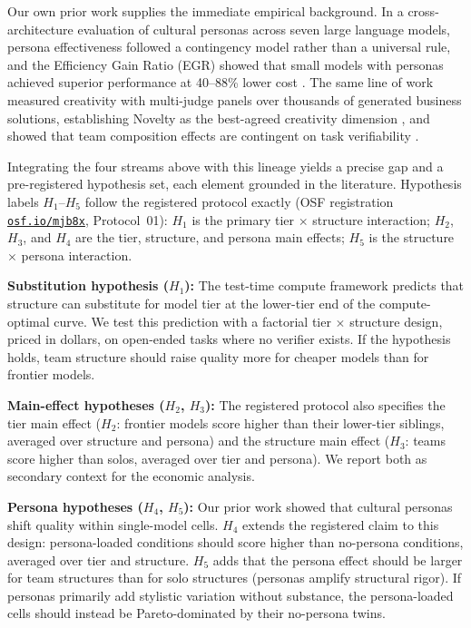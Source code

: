 \documentclass[12pt,a4paper]{article}
\begin{document}
Our own prior work supplies the immediate empirical background. In a
cross-architecture evaluation of cultural personas across seven large language
models, persona effectiveness followed a contingency model rather than a
universal rule, and the Efficiency Gain Ratio (EGR) showed that small models
with personas achieved superior performance at 40--88\% lower cost
\citep{Hariri2026b}. The same line of work measured creativity with multi-judge
panels over thousands of generated business solutions, establishing Novelty as
the best-agreed creativity dimension \citep{Hariri2025a}, and showed that team
composition effects are contingent on task verifiability \citep{Hariri2025b}.

Integrating the four streams above with this lineage yields a precise gap and
a pre-registered hypothesis set, each element grounded in the literature.
Hypothesis labels $H_1$--$H_5$ follow the registered protocol exactly
(OSF registration \href{https://osf.io/mjb8x}{\texttt{osf.io/mjb8x}},
Protocol~01): $H_1$ is the primary tier $\times$ structure interaction;
$H_2$, $H_3$, and $H_4$ are the tier, structure, and persona main effects;
$H_5$ is the structure $\times$ persona interaction.

\medskip
\noindent\textbf{Substitution hypothesis ($H_1$):} The test-time compute
framework \citep{SnellEtAl2024} predicts that structure can substitute for
model tier at the lower-tier end of the compute-optimal curve. We test this
prediction with a factorial tier $\times$ structure design, priced in dollars,
on open-ended tasks where no verifier exists. If the hypothesis holds, team
structure should raise quality more for cheaper models than for frontier
models.

\medskip
\noindent\textbf{Main-effect hypotheses ($H_2$, $H_3$):} The registered
protocol also specifies the tier main effect ($H_2$: frontier models score
higher than their lower-tier siblings, averaged over structure and persona)
and the structure main effect ($H_3$: teams score higher than solos, averaged
over tier and persona). We report both as secondary context for the economic
analysis.

\medskip
\noindent\textbf{Persona hypotheses ($H_4$, $H_5$):} Our prior work
\citep{Hariri2026b} showed that cultural personas shift quality within
single-model cells. $H_4$ extends the registered claim to this design:
persona-loaded conditions should score higher than no-persona conditions,
averaged over tier and structure. $H_5$ adds that the persona effect should be
larger for team structures than for solo structures (personas amplify
structural rigor). If personas primarily add stylistic variation without
substance, the persona-loaded cells should instead be Pareto-dominated by
their no-persona twins.
\end{document}
